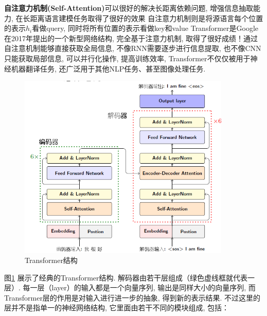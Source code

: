 \documentclass[a4paper]{article}
\theoremstyle{definition}
\numberwithin{equation}{section}
\newcommand{\parinterval}{\noindent\hspace{2em}}%
\begin{document}
\textbf{自注意力机制(Self-Attention)}可以很好的解决长距离依赖问题, 增强信息抽取能力, 在长距离语言建模任务取得了很好的效果
 自注意力机制则是将源语言每个位置的表示$h_i$看做query, 同时将所有位置的表示看做key和value
 Transformer是Google在2017年提出的一个新型网络结构, 完全基于注意力机制, 取得了很好成绩！通过自注意机制能够直接获取全局信息, 不像RNN需要逐步进行信息提取, 也不像CNN只能获取局部信息, 可以并行化操作, 提高训练效率, Transformer不仅仅被用于神经机器翻译任务, 还广泛用于其他NLP任务、甚至图像处理任务. 
\begin{figure}[htp]
    \centering
\includegraphics[width=0.9\textwidth]{Transformer1.png}
    \caption{Transformer结构}
    \label{Transformer}
    \end{figure}
    \parinterval 图\ref{Transformer} 展示了经典的Transformer结构. 解码器由若干层组成（绿色虚线框就代表一层）. 每一层（layer）的输入都是一个向量序列, 输出是同样大小的向量序列, 而Transformer层的作用是对输入进行进一步的抽象, 得到新的表示结果. 不过这里的层并不是指单一的神经网络结构, 它里面由若干不同的模块组成, 包括：
\end{document}
